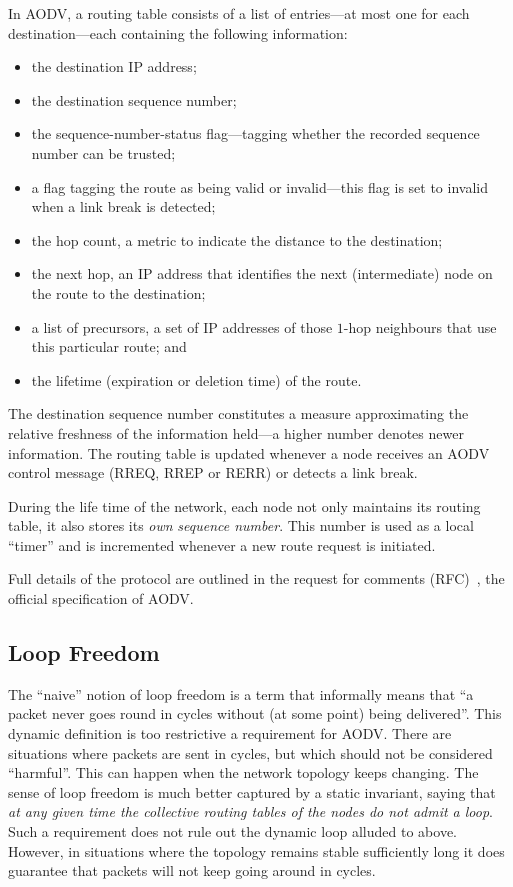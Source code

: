 \documentclass[letterpaper]{sig-alternate-pages}
\begin{document}
In AODV, a routing table consists of a list of entries---at most one for each destination---each containing the following information:

\begin{itemize}[leftmargin=13.2pt]
\setlength{\itemsep}{-1pt}
\item the destination IP address;
\item the destination sequence number;
\item the sequence-number-status flag---tagging whether the recorded sequence number
can be trusted;
\item a flag tagging the route as being valid or invalid---this flag is set to invalid
when a link break is detected;
\item the hop count, a metric to indicate the distance to the destination;
\item the next hop, an IP address that
identifies the next (intermediate) node on the route to the destination;
\item a list of precursors, a set of IP addresses of those
  $1$-hop neighbours that use this particular route; and
\item the lifetime (expiration or deletion time) of the route.
\end{itemize}
The destination sequence number constitutes a measure approximating the
relative freshness of the information held---a higher number denotes newer information.  
The  routing table  is updated whenever a node receives an AODV control message (RREQ, RREP or RERR)
or detects a link break. 

During the life time of the network, each node not only maintains its routing table, it also stores
its {\em own} {\em sequence number}.  This number is used as a local ``timer'' and is incremented 
whenever a new route request is initiated. 

Full details of the protocol are outlined in the request for comments (RFC)~\cite{rfc3561},
the official specification of AODV.

\subsection{Loop Freedom}\label{ssec:loopfreedom}
The ``naive'' notion of loop freedom is a term that informally means that ``a packet never goes round in cycles without (at some point) being delivered''. This dynamic definition is too restrictive a requirement for AODV. There are situations where packets are sent in cycles, but which should not be considered ``harmful''. This can happen when the network topology keeps changing. 
The sense of loop freedom is much better captured by a 
static invariant, saying that {\em at any given time the collective routing tables of the nodes 
do not admit a loop}. Such a requirement does not rule out the dynamic loop 
alluded to above. However, in situations where the topology remains stable sufficiently long it does 
guarantee that packets will not keep going around in cycles.
\end{document}
